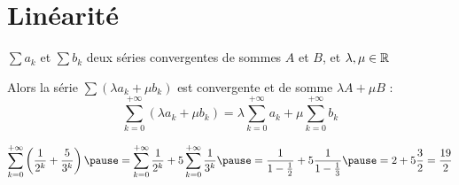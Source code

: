 \section{Linéarité}

\begin{frame}
\begin{proposition}
$\sum a_k$ et $\sum b_k$ deux séries convergentes de sommes $A$ et $B$, et $\lambda, \mu \in \mathbb{R}$

\pause
Alors la série $\sum (\lambda a_k+\mu b_k)$ est convergente et de somme
 $\lambda A+\mu B$ :
 \pause \vspace{-.2cm}
 $$\sum_{k=0}^{+\infty} (\lambda a_k+\mu b_k) = 
 \lambda \sum_{k=0}^{+\infty} a_k+ \mu \sum_{k=0}^{+\infty} b_k$$
\end{proposition}

\pause
 \vspace{-.2cm}
$$
\sum_{k=0}^{+\infty} \left(\frac{1}{2^k}+\frac{5}{3^k}\right)
 \pause= 
\sum_{k=0}^{+\infty} \frac{1}{2^k}+
5\sum_{k=0}^{+\infty} \frac{1}{3^k}
\pause=
\frac{1}{1-\frac{1}{2}}+5\frac{1}{1-\frac{1}{3}} 
\pause= 2+5\frac{3}{2}=\frac{19}{2}
$$

\end{frame}

%
%
%


